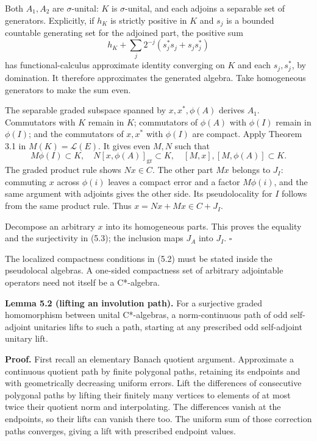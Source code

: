 \documentclass[
  11pt,
]{article}
\begin{document}
Both \(A_1,A_2\) are \(\sigma\)-unital: \(K\) is \(\sigma\)-unital, and
each adjoins a separable set of generators. Explicitly, if \(h_K\) is
strictly positive in \(K\) and \(s_j\) is a bounded countable generating
set for the adjoined part, the positive sum \[
h_K+\sum_j2^{-j}(s_j^*s_j+s_js_j^*)
\tag{5.6}
\] has functional-calculus approximate identity converging on \(K\) and
each \(s_j,s_j^*\), by domination. It therefore approximates the
generated algebra. Take homogeneous generators to make the sum even.

The separable graded subspace spanned by \(x,x^*,\phi(A)\) derives
\(A_1\). Commutators with \(K\) remain in \(K\); commutators of
\(\phi(A)\) with \(\phi(I)\) remain in \(\phi(I)\); and the commutators
of \(x,x^*\) with \(\phi(I)\) are compact. Apply Theorem 3.1 in
\(M(K)=\mathcal L(E)\). It gives even \(M,N\) such that \[
M\phi(I)\subset K,\quad
N[x,\phi(A)]_{\mathrm{gr}}\subset K,\quad
[M,x],[M,\phi(A)]\subset K.
\tag{5.7}
\] The graded product rule shows \(Nx\in C\). The other part \(Mx\)
belongs to \(J_I\): commuting \(x\) across \(\phi(i)\) leaves a compact
error and a factor \(M\phi(i)\), and the same argument with adjoints
gives the other side. Its pseudolocality for \(I\) follows from the same
product rule. Thus \(x=Nx+Mx\in C+J_I\).

Decompose an arbitrary \(x\) into its homogeneous parts. This proves the
equality and the surjectivity in (5.3); the inclusion maps \(J_A\) into
\(J_I\). \(\square\)

The localized compactness conditions in (5.2) must be stated inside the
pseudolocal algebras. A one-sided compactness set of arbitrary
adjointable operators need not itself be a C*-algebra.

\textbf{Lemma 5.2 (lifting an involution path).} For a surjective graded
homomorphism between unital C*-algebras, a norm-continuous path of odd
self-adjoint unitaries lifts to such a path, starting at any prescribed
odd self-adjoint unitary lift.

\textbf{Proof.} First recall an elementary Banach quotient argument.
Approximate a continuous quotient path by finite polygonal paths,
retaining its endpoints and with geometrically decreasing uniform
errors. Lift the differences of consecutive polygonal paths by lifting
their finitely many vertices to elements of at most twice their quotient
norm and interpolating. The differences vanish at the endpoints, so
their lifts can vanish there too. The uniform sum of those correction
paths converges, giving a lift with prescribed endpoint values.
\end{document}
